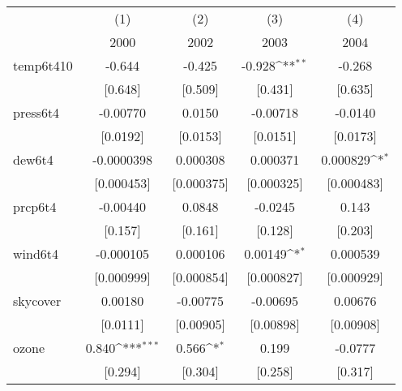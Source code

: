 \documentclass[11pt]{article}
\begin{document}
\begin{subappendices}
		\newpage
		\begin{center}
			 \label{tab:title} 
			{
			{
				\def\sym#1{\ifmmode^{#1}\else\(^{#1}\)\fi}
				\begin{tabular}{l*{4}{c}}
					\hline\hline
					&\multicolumn{1}{c}{(1)}&\multicolumn{1}{c}{(2)}&\multicolumn{1}{c}{(3)}&\multicolumn{1}{c}{(4)}\\
					&\multicolumn{1}{c}{2000}&\multicolumn{1}{c}{2002}&\multicolumn{1}{c}{2003}&\multicolumn{1}{c}{2004}\\
					\hline
					temp6t410   &      -0.644         &      -0.425         &      -0.928\sym{**} &      -0.268         \\
					&     [0.648]         &     [0.509]         &     [0.431]         &     [0.635]         \\
					[1em]
					press6t4    &    -0.00770         &      0.0150         &    -0.00718         &     -0.0140         \\
					&    [0.0192]         &    [0.0153]         &    [0.0151]         &    [0.0173]         \\
					[1em]
					dew6t4      &  -0.0000398         &    0.000308         &    0.000371         &    0.000829\sym{*}  \\
					&  [0.000453]         &  [0.000375]         &  [0.000325]         &  [0.000483]         \\
					[1em]
					prcp6t4     &    -0.00440         &      0.0848         &     -0.0245         &       0.143         \\
					&     [0.157]         &     [0.161]         &     [0.128]         &     [0.203]         \\
					[1em]
					wind6t4     &   -0.000105         &    0.000106         &     0.00149\sym{*}  &    0.000539         \\
					&  [0.000999]         &  [0.000854]         &  [0.000827]         &  [0.000929]         \\
					[1em]
					skycover    &     0.00180         &    -0.00775         &    -0.00695         &     0.00676         \\
					&    [0.0111]         &   [0.00905]         &   [0.00898]         &   [0.00908]         \\
					[1em]
					ozone       &       0.840\sym{***}&       0.566\sym{*}  &       0.199         &     -0.0777         \\
					&     [0.294]         &     [0.304]         &     [0.258]         &     [0.317]         \\

\end{tabular}}}
\end{center}
\end{subappendices}
\end{document}
